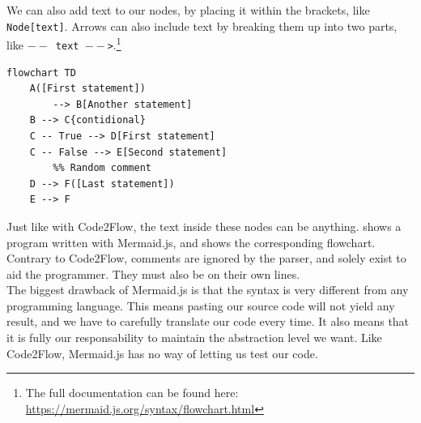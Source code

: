 We can also add text to our nodes, by placing it within the brackets, like \texttt{Node[text]}. Arrows can also include text by breaking them up into two parts, like \texttt{$--$ text $--$>}.\footnote{The full documentation can be found here: \url{https://mermaid.js.org/syntax/flowchart.html}} \\

\begin{lstlisting}[caption={A mermaid.js program.}, captionpos=b, label={A mermaid.js program.}]
flowchart TD
    A([First statement])
        --> B[Another statement]
    B --> C{contidional}
    C -- True --> D[First statement]
    C -- False --> E[Second statement]
        %% Random comment
    D --> F([Last statement])
    E --> F
\end{lstlisting}

Just like with Code2Flow, the text inside these nodes can be anything.  shows a program written with Mermaid.js, and  shows the corresponding flowchart. Contrary to Code2Flow, comments are ignored by the parser, and solely exist to aid the programmer. They must also be on their own lines. \\

The biggest drawback of Mermaid.js is that the syntax is very different from any programming language. This means pasting our source code will not yield any result, and we have to carefully translate our code every time. It also means that it is fully our responsability to maintain the abstraction level we want. Like Code2Flow, Mermaid.js has no way of letting us test our code. \\

